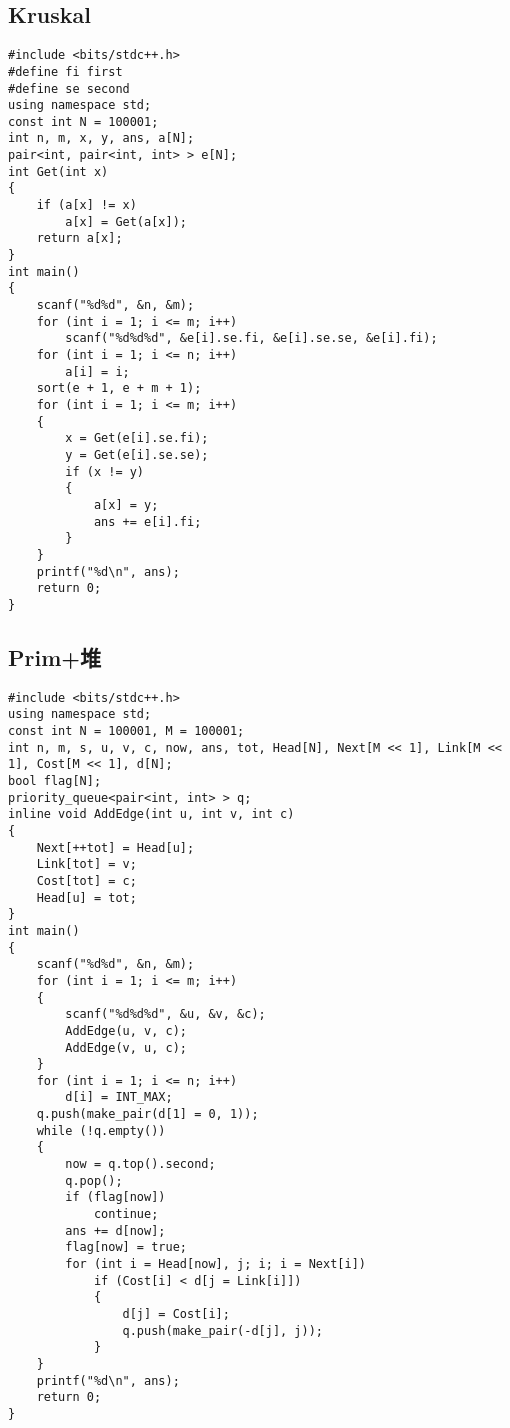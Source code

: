 \documentclass[a4paper]{article}
\begin{document}
\subsection{Kruskal}
\begin{lstlisting}
#include <bits/stdc++.h>
#define fi first
#define se second
using namespace std;
const int N = 100001;
int n, m, x, y, ans, a[N];
pair<int, pair<int, int> > e[N];
int Get(int x)
{
	if (a[x] != x)
		a[x] = Get(a[x]);
	return a[x];
}
int main()
{
	scanf("%d%d", &n, &m);
	for (int i = 1; i <= m; i++)
		scanf("%d%d%d", &e[i].se.fi, &e[i].se.se, &e[i].fi);
    for (int i = 1; i <= n; i++)
        a[i] = i;
	sort(e + 1, e + m + 1);
	for (int i = 1; i <= m; i++)
	{
		x = Get(e[i].se.fi);
		y = Get(e[i].se.se);
		if (x != y)
		{
			a[x] = y;
			ans += e[i].fi;
		}
	}
	printf("%d\n", ans);
	return 0;
}
\end{lstlisting}
\subsection{Prim+堆}
\begin{lstlisting}
#include <bits/stdc++.h>
using namespace std;
const int N = 100001, M = 100001;
int n, m, s, u, v, c, now, ans, tot, Head[N], Next[M << 1], Link[M << 1], Cost[M << 1], d[N];
bool flag[N];
priority_queue<pair<int, int> > q;
inline void AddEdge(int u, int v, int c)
{
    Next[++tot] = Head[u];
    Link[tot] = v;
    Cost[tot] = c;
    Head[u] = tot;
}
int main()
{
    scanf("%d%d", &n, &m);
    for (int i = 1; i <= m; i++)
    {
        scanf("%d%d%d", &u, &v, &c);
        AddEdge(u, v, c);
        AddEdge(v, u, c);
    }
    for (int i = 1; i <= n; i++)
        d[i] = INT_MAX;
    q.push(make_pair(d[1] = 0, 1));
    while (!q.empty())
    {
        now = q.top().second;
        q.pop();
        if (flag[now])
            continue;
        ans += d[now];
        flag[now] = true;
        for (int i = Head[now], j; i; i = Next[i])
            if (Cost[i] < d[j = Link[i]])
            {
                d[j] = Cost[i];
                q.push(make_pair(-d[j], j));
            }
    }
    printf("%d\n", ans);
    return 0;
}
\end{lstlisting}
\end{document}
